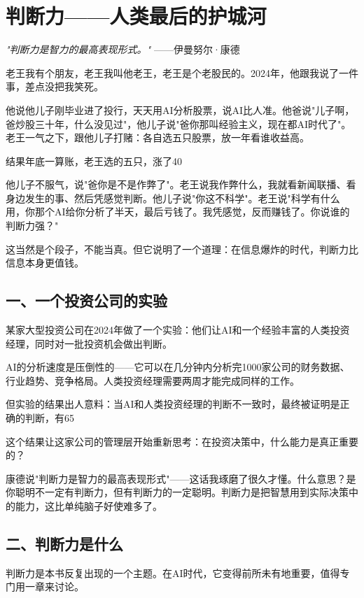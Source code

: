 \chapter{判断力——人类最后的护城河}


\textit{"判断力是智力的最高表现形式。"}
——伊曼努尔·康德


老王我有个朋友，老王我叫他老王，老王是个老股民的。2024年，他跟我说了一件事，差点没把我笑死。

他说他儿子刚毕业进了投行，天天用AI分析股票，说AI比人准。他爸说"儿子啊，爸炒股三十年，什么没见过"，他儿子说"爸你那叫经验主义，现在都AI时代了"。老王一气之下，跟他儿子打赌：各自选五只股票，放一年看谁收益高。

结果年底一算账，老王选的五只，涨了40%

他儿子不服气，说"爸你是不是作弊了"。老王说我作弊什么，我就看新闻联播、看身边发生的事、然后凭感觉判断。他儿子说"你这不科学"。老王说"科学有什么用，你那个AI给你分析了半天，最后亏钱了。我凭感觉，反而赚钱了。你说谁的判断力强？"

这当然是个段子，不能当真。但它说明了一个道理：在信息爆炸的时代，判断力比信息本身更值钱。

\section{一、一个投资公司的实验}


某家大型投资公司在2024年做了一个实验：他们让AI和一个经验丰富的人类投资经理，同时对一批投资机会做出判断。

AI的分析速度是压倒性的——它可以在几分钟内分析完1000家公司的财务数据、行业趋势、竞争格局。人类投资经理需要两周才能完成同样的工作。

但实验的结果出人意料：当AI和人类投资经理的判断不一致时，最终被证明是正确的判断，有65%

这个结果让这家公司的管理层开始重新思考：在投资决策中，什么能力是真正重要的？

康德说"判断力是智力的最高表现形式"——这话我琢磨了很久才懂。什么意思？是你聪明不一定有判断力，但有判断力的一定聪明。判断力是把智慧用到实际决策中的能力，这比单纯脑子好使难多了。

\section{二、判断力是什么}


判断力是本书反复出现的一个主题。在AI时代，它变得前所未有地重要，值得专门用一章来讨论。

